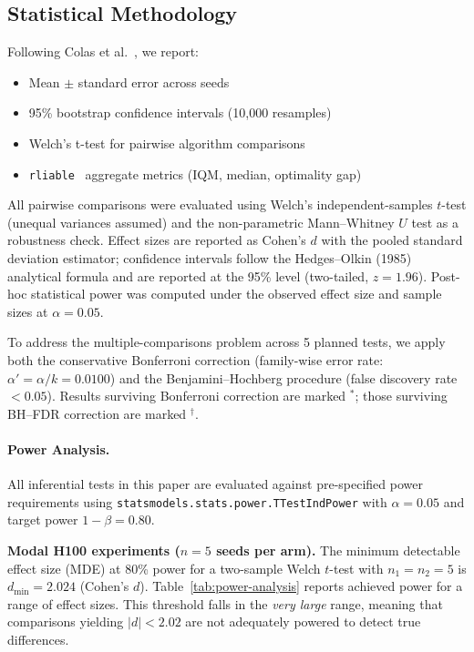 \documentclass{article}
\begin{document}
\subsection{Statistical Methodology}

Following Colas et al.~\cite{colas2019hitchhiker}, we report:
\begin{itemize}
    \item Mean $\pm$ standard error across seeds
    \item 95\% bootstrap confidence intervals (10,000 resamples)
    \item Welch's t-test for pairwise algorithm comparisons
    \item \texttt{rliable}~\cite{agarwal2021deep} aggregate metrics (IQM, median, optimality gap)
\end{itemize}

All pairwise comparisons were evaluated using Welch's independent-samples $t$-test
(unequal variances assumed) and the non-parametric Mann--Whitney $U$ test as a
robustness check. Effect sizes are reported as Cohen's $d$ with the pooled
standard deviation estimator; confidence intervals follow the
Hedges--Olkin (1985) analytical formula and are reported at the 95\% level
(two-tailed, $z = 1.96$). Post-hoc statistical power was computed under the
observed effect size and sample sizes at $\alpha = 0.05$.

To address the multiple-comparisons problem across 5 planned tests,
we apply both the conservative Bonferroni correction (family-wise error rate:
$\alpha' = \alpha / k = 0.0100$) and the Benjamini--Hochberg procedure
(false discovery rate $< 0.05$). Results surviving Bonferroni correction are
marked $^*$; those surviving BH--FDR correction are marked $^\dag$.

\paragraph{Power Analysis.}
All inferential tests in this paper are evaluated against pre-specified power
requirements using \texttt{statsmodels.stats.power.TTestIndPower} with
$\alpha = 0.05$ and target power $1 - \beta = 0.80$.

\textbf{Modal H100 experiments ($n = 5$ seeds per arm).}
The minimum detectable effect size (MDE) at 80\% power for a two-sample
Welch $t$-test with $n_1 = n_2 = 5$ is
$d_{\min} = 2.024$ (Cohen's $d$).
Table~\ref{tab:power-analysis} reports achieved power for a range of effect sizes.
This threshold falls in the \emph{very large} range, meaning that
comparisons yielding $|d| < 2.02$
are not adequately powered to detect true differences.
\end{document}
